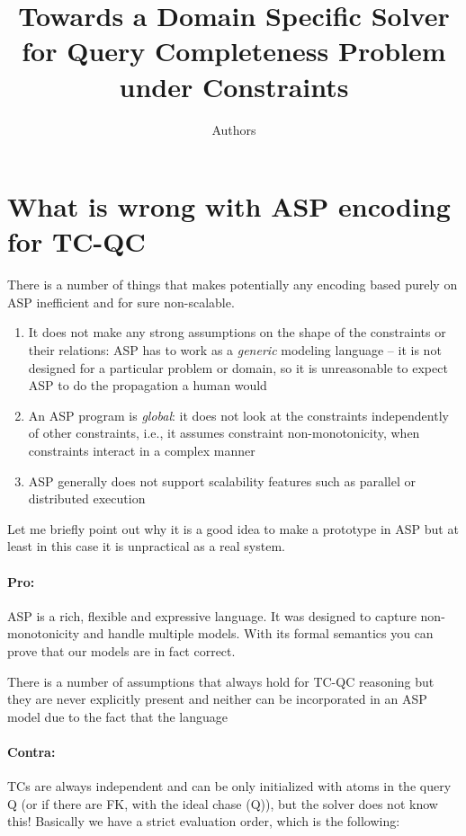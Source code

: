 \documentclass{article}
\author{Authors}
\title{Towards a Domain Specific Solver for Query Completeness Problem under Constraints}
\begin{document}
\maketitle

\section{What is wrong with ASP encoding for TC-QC}

There is a number of things that makes potentially any encoding based purely on ASP inefficient and for sure non-scalable.

\begin{enumerate}
  \item It does not make any strong assumptions on the shape of the constraints or their relations: ASP has to work as a \textit{generic} modeling language -- it is not designed for a particular problem or domain, so it is unreasonable to expect ASP to do the propagation a human would
  \item An ASP program is \textit{global}: it does not look at the constraints independently of other constraints, i.e., it assumes constraint non-monotonicity, when constraints interact in a complex manner
  \item ASP generally does not support scalability features such as parallel or distributed execution
\end{enumerate}

Let me briefly point out why it is a good idea to make a prototype in ASP but at least in this case it is unpractical as a real system.

\paragraph{Pro:} ASP is a rich, flexible and expressive language. It was designed to capture non-monotonicity and handle multiple models. With its formal semantics you can prove that our models are in fact correct.

There is a number of assumptions that always hold for TC-QC reasoning but they are never explicitly present and neither can be incorporated in an ASP model due to the fact that the language 
\paragraph{Contra:} TCs are always independent and can be only initialized with atoms in the query Q (or if there are FK, with the ideal chase (Q)), but the solver does not know this! Basically we have a strict evaluation order, which is the following:
\pagebreak
\end{document}

